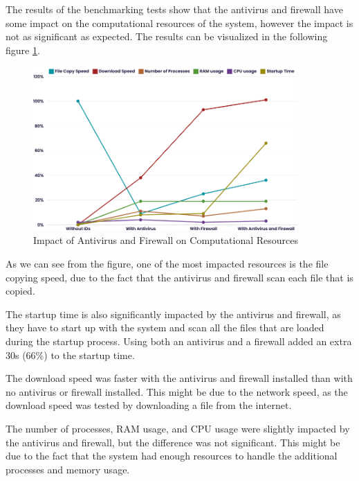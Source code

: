 \documentclass[runningheads,a4paper,english]{llncs}[2022/01/12]
\begin{document}
\par The results of the benchmarking tests show that the antivirus and firewall
have some impact on the computational resources of the system, however the
impact is not as significant as expected. The results can be visualized in
the following figure \cref{fig:impact}.

\begin{figure}[!ht]
  \centering
  \includegraphics[width=0.9\textwidth]{resources/benchamrking_results.png}
  \caption{Impact of Antivirus and Firewall on Computational Resources}
  \label{fig:impact}
\end{figure}

\par As we can see from the figure, one of the most impacted resources is the
file copying speed, due to the fact that the antivirus and firewall scan each
file that is copied.
\par The startup time is also significantly impacted by the antivirus and
firewall, as they have to start up with the system and scan all the files that
are loaded during the startup process. Using both an antivirus and a firewall
added an extra 30s (66\%) to the startup time.
\par The download speed was faster with the antivirus and firewall installed
than with no antivirus or firewall installed. This might be due to the network
speed, as the download speed was tested by downloading a file from the internet.
\par The number of processes, RAM usage, and CPU usage were slightly impacted
by the antivirus and firewall, but the difference was not significant. This
might be due to the fact that the system had enough resources to handle the
additional processes and memory usage.

\end{document}
